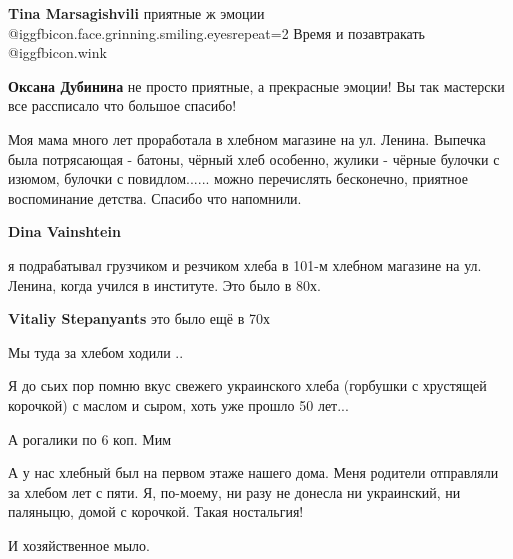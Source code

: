 \begin{itemize}
\begin{itemize} %
\textbf{Tina Marsagishvili} приятные ж эмоции @igg{fbicon.face.grinning.smiling.eyes}{repeat=2}  Время и позавтракать @igg{fbicon.wink} 

\textbf{Оксана Дубинина} не просто приятные, а прекрасные эмоции! Вы так мастерски все рассписало что большое спасибо!
\end{itemize} %


Моя мама много лет проработала в хлебном магазине на ул. Ленина. Выпечка была
потрясающая - батоны, чёрный хлеб особенно, жулики - чёрные булочки с изюмом,
булочки с повидлом...... можно перечислять бесконечно, приятное воспоминание
детства. Спасибо что напомнили.

\begin{itemize} %
\textbf{Dina Vainshtein} 

я подрабатывал грузчиком и резчиком хлеба в 101-м хлебном магазине на ул.
Ленина, когда учился в институте. Это было в 80х.

\textbf{Vitaliy Stepanyants} это было ещё в 70х

Мы туда за хлебом ходили ..
\end{itemize} %


Я до сьих пор помню вкус свежего украинского хлеба (горбушки с хрустящей
корочкой) с маслом и сыром, хоть уже прошло 50 лет...

А рогалики по 6 коп. Мим


А у нас хлебный был на первом этаже нашего дома. Меня родители отправляли за
хлебом лет с пяти. Я, по-моему, ни разу не донесла ни украинский, ни паляныцю,
домой с корочкой. Такая ностальгия!


И хозяйственное мыло.

\end{itemize} %
